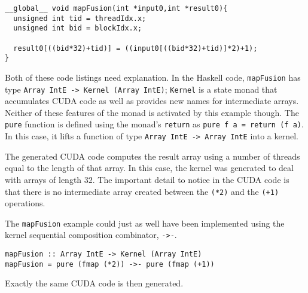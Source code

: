\begin{codesize} 
\begin{verbatim}
__global__ void mapFusion(int *input0,int *result0){
  unsigned int tid = threadIdx.x;
  unsigned int bid = blockIdx.x;
  
  result0[((bid*32)+tid)] = ((input0[((bid*32)+tid)]*2)+1);
}
\end{verbatim}
\end{codesize}
Both of these code listings need explanation. In the Haskell 
code, {\tt mapFusion} has type {\tt Array IntE -> Kernel (Array IntE)};
{\tt Kernel} is a state monad that accumulates CUDA code as well as provides 
new names for intermediate arrays. Neither of these features of the monad 
is activated by this example though. The {\tt pure} function is defined 
using the monad's {\tt return} as {\tt pure f a = return (f a)}. In this case, 
it lifts a function of type {\tt Array IntE -> Array IntE} into 
a kernel. 

The generated CUDA code computes the result array using a number of threads 
equal to the length of that array. In this case, the kernel was generated
to deal with arrays of length $32$. The important detail to notice in the 
CUDA code is that there is no intermediate array created between the 
{\tt (*2)} and the {\tt (+1)} operations. 

The {\tt mapFusion} example could just as well have been implemented using 
the kernel sequential composition combinator, {\tt ->-}. 
\begin{codesize} 
\begin{verbatim}
mapFusion :: Array IntE -> Kernel (Array IntE) 
mapFusion = pure (fmap (*2)) ->- pure (fmap (+1)) 
\end{verbatim}
\end{codesize}
Exactly the same CUDA code is then generated.

